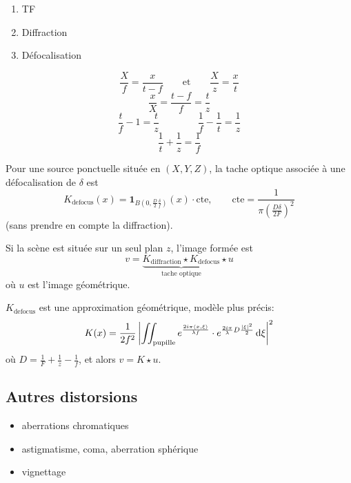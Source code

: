 
\begin{enumerate}[label=\arabic*)]
  \item TF
  \item Diffraction
  \item Défocalisation
\end{enumerate}

\begin{figure}[!h]\centering
  
\end{figure}

\[
  \frac Xf=\frac{x}{t-f}
  \qquad\text{et}\qquad
  \frac Xz=\frac xt
\]
\[
  \frac xX=\frac{t-f}{f}=\frac tz
\]
\[
  \frac tf-1=\frac tz
  \qquad\qquad
  \frac1f-\frac1t=\frac1z
\]
\[
  \boxed{\frac1t+\frac1z=\frac1f}
\]

Pour une source ponctuelle située en $(X,Y,Z)$, la tache optique associée à une défocalisation de $\delta$ est
\[
  K_{\mathrm{defocus}}(x)=\mathbf{1}_{B\left(0,\frac D2\frac\delta f\right)}(x)\cdot\mathrm{cte},
  \qquad
  \mathrm{cte}=\frac{1}{\pi\left(\frac{D\delta}{2F}\right)^{2}}
\]
(sans prendre en compte la diffraction).

Si la scène est située sur un seul plan $z$, l'image formée est
\[
  v=\underbrace{K_{\mathrm{diffraction}}\star K_{\mathrm{defocus}}}_{\text{tache optique}}\star u
\]
où $u$ est l'image géométrique.

\begin{remark}
  $K_{\mathrm{defocus}}$ est une approximation géométrique, modèle plus précis:
  \[
    K(x)=\frac{1}{2f^{2}}
    \left|\iint_{\mathrm{pupille}}
      e^{\frac{2i\pi\langle x,\xi\rangle}{\lambda f}}\cdot
      e^{\frac{2i\pi}{\lambda}D\frac{|\xi|^{2}}{2}}\,\mathrm{d}\xi\right|^{2}
  \]
  où $D=\frac1F+\frac1z-\frac1f$, et alors $v=K\star u$.
\end{remark}

\subsection{Autres distorsions}
 
\begin{itemize}
  \item aberrations chromatiques
  \item astigmatisme, coma, aberration sphérique
  \item vignettage
\end{itemize}
 
